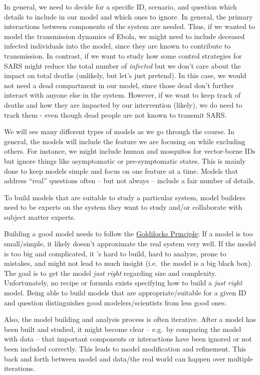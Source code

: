 \documentclass[]{book}
\theoremstyle{definition}
\theoremstyle{definition}
\theoremstyle{definition}
\theoremstyle{remark}
\begin{document}
In general, we need to decide for a specific ID, scenario, and question
which details to include in our model and which ones to ignore. In
general, the primary interactions between components of the system are
needed. Thus, if we wanted to model the transmission dynamics of Ebola,
we might need to include deceased infected individuals into the model,
since they are known to contribute to transmission. In contrast, if we
want to study how some control strategies for SARS might reduce the
total number of \emph{infected} but we don't care about the impact on
total deaths (unlikely, but let's just pretend). In this case, we would
not need a dead compartment in our model, since those dead don't further
interact with anyone else in the system. However, if we want to keep
track of deaths and how they are impacted by our intervention (likely),
we do need to track them - even though dead people are not known to
transmit SARS.

We will see many different types of models as we go through the course.
In general, the models will include the feature we are focusing on while
excluding others. For instance, we might include human and mosquitos for
vector-borne IDs but ignore things like asymptomatic or pre-symptomatic
states. This is mainly done to keep models simple and focus on one
feature at a time. Models that address ``real'' questions often -- but
not always -- include a fair number of details.

To build models that are suitable to study a particular system, model
builders need to be experts on the system they want to study and/or
collaborate with subject matter experts.

Building a good model needs to follow the
\href{https://en.wikipedia.org/wiki/Goldilocks_principle}{Goldilocks
Principle}: If a model is too small/simple, it likely doesn't
approximate the real system very well. If the model is too big and
complicated, it 's hard to build, hard to analyze, prone to mistakes,
and might not lead to much insight (i.e.~the model is a big black box).
The goal is to get the model \emph{just right} regarding size and
complexity. Unfortunately, no recipe or formula exists specifying how to
build a \emph{just right} model. Being able to build models that are
appropriate/suitable for a given ID and question distinguishes good
modelers/scientists from less good ones.

Also, the model building and analysis process is often iterative. After
a model has been built and studied, it might become clear -- e.g.~by
comparing the model with data -- that important components or
interactions have been ignored or not been included correctly. This
leads to model modification and refinement. This back and forth between
model and data/the real world can happen over multiple iterations.
\end{document}
